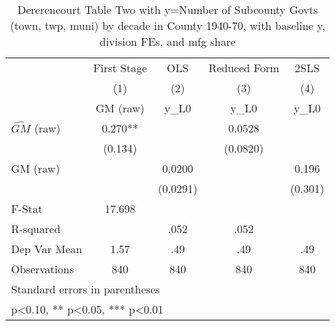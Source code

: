 \begin{table}[htbp]\centering
\def\sym#1{\ifmmode^{#1}\else\(^{#1}\)\fi}
\caption{Dererencourt Table Two with y=Number of Subcounty Govts (town, twp, muni) by decade in County 1940-70, with baseline y, division FEs, and mfg share}
\begin{tabular}{l*{4}{c}}
\toprule
                    & First Stage   &         OLS   &Reduced Form   &        2SLS   \\
                    &\multicolumn{1}{c}{(1)}&\multicolumn{1}{c}{(2)}&\multicolumn{1}{c}{(3)}&\multicolumn{1}{c}{(4)}\\
                    &\multicolumn{1}{c}{GM  (raw)}&\multicolumn{1}{c}{y\_L0}&\multicolumn{1}{c}{y\_L0}&\multicolumn{1}{c}{y\_L0}\\
\midrule
$\hat{GM}$ (raw)    &       0.270** &               &      0.0528   &               \\
                    &     (0.134)   &               &    (0.0820)   &               \\
\addlinespace
GM  (raw)           &               &      0.0200   &               &       0.196   \\
                    &               &    (0.0291)   &               &     (0.301)   \\
\midrule
F-Stat              &      17.698   &               &               &               \\
R-squared           &               &        .052   &        .052   &               \\
Dep Var Mean        &        1.57   &         .49   &         .49   &         .49   \\
Observations        &         840   &         840   &         840   &         840   \\
\bottomrule
\multicolumn{5}{l}{\footnotesize Standard errors in parentheses}\\
\multicolumn{5}{l}{\footnotesize * p<0.10, ** p<0.05, *** p<0.01}\\
\end{tabular}
\end{table}
